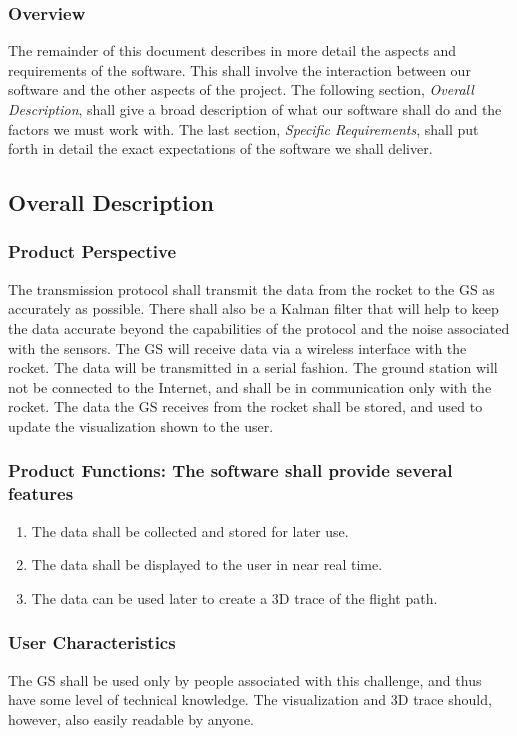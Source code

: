 \documentclass[onecolumn, draftclsnofoot,10pt, compsoc]{IEEEtran}
\begin{document}
\subsubsection{Overview}
The remainder of this document describes in more detail the aspects and
requirements of the software. This shall involve the interaction between our software and the
other aspects of the project. The following section, \textit{Overall Description}, shall give a broad
description of what our software shall do and the factors we must work with. The last section,
\textit{Specific Requirements}, shall put forth in detail the exact expectations of the software we shall
deliver.
\subsection{Overall Description}
\subsubsection{Product Perspective}
The transmission protocol shall transmit the data from the rocket to
the GS as accurately as possible. There shall also be a Kalman filter that will help to keep the
data accurate beyond the capabilities of the protocol and the noise associated with the
sensors. The GS will receive data via a wireless interface with the rocket. The data will be
transmitted in a serial fashion. The ground station will not be connected to the Internet, and
shall be in communication only with the rocket. The data the GS receives from the rocket shall
be stored, and used to update the visualization shown to the user.
\subsubsection{Product Functions: The software shall provide several features}
 \begin{enumerate}
    \item The data shall be collected and stored for later use.
    \item The data shall be displayed to the user in near real time.
    \item The data can be used later to create a 3D trace of the flight path.
 \end{enumerate}
\subsubsection{User Characteristics}
The GS shall be used only by people associated with this
challenge, and thus have some level of technical knowledge. The visualization and 3D trace
should, however, also easily readable by anyone.
\end{document}

